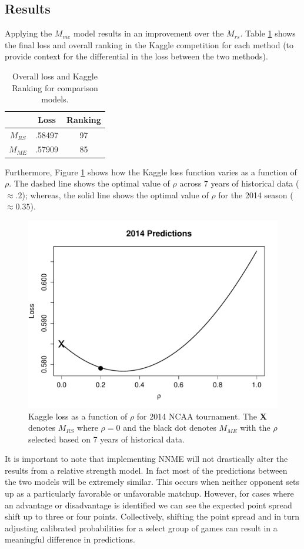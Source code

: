 \documentclass[letterpaper,12pt]{article}
\begin{document}
 \subsection{Results}
Applying the $M_{me}$ model results in an improvement over the $M_{rs}$. Table \ref{tab:results} shows the final loss and overall ranking in the Kaggle competition for each method (to provide context for the differential in the loss between the two methods).
\begin{table}[h!]
\caption{Overall loss and Kaggle Ranking for comparison models.\label{tab:results}}
\centering
\begin{tabular}{|c|cc|}
  \hline
    & Loss & Ranking\\ 
  \hline
  $M_{RS}$ & .58497 & 97 \\
  $M_{ME}$ & .57909 & 85 \\
   \hline
   \hline
\end{tabular}
\end{table}
Furthermore, Figure \ref{fig:result} shows how the Kaggle loss function varies as a function of $\rho$. The dashed line shows the optimal value of $\rho$ across 7 years of historical data ($\approx .2$); whereas, the solid line shows the optimal value of $\rho$ for the 2014 season ($\approx 0.35$). 
\begin{figure}[h!]
\centering
\includegraphics[width=.8\textwidth]{Predictions.pdf}
\caption{Kaggle loss as a function of $\rho$ for 2014 NCAA tournament. The {\bf X} denotes $M_{RS}$ where $\rho = 0$ and the black dot denotes $M_{ME}$ with the $\rho$ selected based on 7 years of historical data.}
\label{fig:result}
\end{figure} 

It is important to note that implementing NNME will not drastically alter the results from a relative strength model. In fact most of the predictions between the two models will be extremely similar. This occurs when neither opponent sets up as a particularly favorable or unfavorable matchup. However, for cases where an advantage or disadvantage is identified we can see the expected point spread shift up to three or four points. Collectively, shifting the point spread and in turn adjusting calibrated probabilities for a select group of games can result in a meaningful difference in predictions. 
\end{document}
